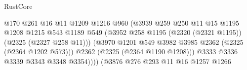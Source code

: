 \begin{lexlean}{RustCore}
\begin{coremodule}
                                                  @170
                                                  @261
                                                  @16
                                                  @11
                                                  @1209
                                                  @1216
                                                  @960
                                                  (@3939
                                                    @259
                                                    @250
                                                    @11
                                                    @15
                                                    @1195
                                                    @1208
                                                    @1215
                                                    @543
                                                    @1189
                                                    @549
                                                    (@3952
                                                      @258
                                                      @1195
                                                      (@2320 (@2321 @1195))
                                                      (@2325 (@2327 @258 @11)))
                                                    (@3970
                                                      @1201
                                                      @549
                                                      @3982
                                                      @3985
                                                      @2362
                                                      (@2325 (@2364 @1202 @573)))
                                                    @2362
                                                    (@2325 (@2364 @1190 @1208)))
                                                  @3333
                                                  @3336
                                                  @3339
                                                  @3343
                                                  @3348
                                                  @3354))))
                                          (@3876
                                            @276
                                            @293
                                            @11
                                            @16
                                            @1257
                                            @1266

\end{coremodule}
\end{lexlean}
